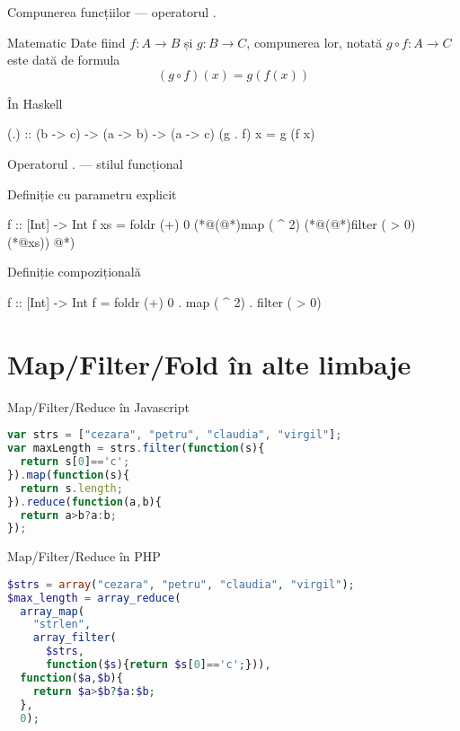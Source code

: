 \documentclass[xcolor=pdftex,romanian,colorlinks]{beamer}
\begin{document}
\begin{frame}[fragile]{Compunerea funcțiilor --- operatorul $.$}
\begin{block}{Matematic}
Date fiind $f : A \rightarrow B$ și $g : B \rightarrow C$, compunerea lor, notată
$g \circ f : A \rightarrow C$ este dată de formula \[(g \circ f)(x) = g(f(x))\]
\end{block}

\begin{block}{În Haskell}
\begin{asciihs}
(.) :: (b -> c) -> (a -> b) -> (a -> c)
(g . f) x = g (f x)
\end{asciihs}
\end{block}
\end{frame}

\begin{frame}[fragile]{Operatorul $.$ --- stilul funcțional}
\begin{block}{Definiție cu parametru explicit}
\begin{asciihs}
f :: [Int] -> Int
f xs = foldr (+) 0 (*@\color{blue}(@*)map ( ^ 2)  (*@\color{blue}(@*)filter ( > 0) (*@\color{blue}xs)) @*)
\end{asciihs}
\end{block}

\begin{block}{Definiție compozițională}
\begin{asciihs}
f :: [Int] -> Int
f = foldr (+) 0 . map ( ^ 2) . filter ( > 0)
\end{asciihs}
\end{block}
\end{frame}




\section{Map/Filter/Fold în alte limbaje}

\begin{frame}[fragile]{Map/Filter/Reduce în Javascript}
\begin{lstlisting}[language=JavaScript,basicstyle=\small]
var strs = ["cezara", "petru", "claudia", "virgil"];
var maxLength = strs.filter(function(s){
  return s[0]=='c';
}).map(function(s){
  return s.length;
}).reduce(function(a,b){
  return a>b?a:b;
});
\end{lstlisting}
\end{frame}


\begin{frame}[fragile]{Map/Filter/Reduce în PHP}
\begin{lstlisting}[language=PHP,basicstyle=\small,morekeywords={array_reduce}]
$strs = array("cezara", "petru", "claudia", "virgil");
$max_length = array_reduce(
  array_map(
    "strlen",
    array_filter(
      $strs,
      function($s){return $s[0]=='c';})),
  function($a,$b){
    return $a>$b?$a:$b;
  }, 
  0);
\end{lstlisting}
\end{frame}
\end{document}
